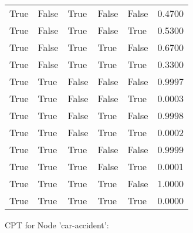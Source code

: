 \begin{tabular}{lllllr}
         True &         False &         True &        False & False & 0.4700 \\
         True &         False &         True &        False &  True & 0.5300 \\
         True &         False &         True &         True & False & 0.6700 \\
         True &         False &         True &         True &  True & 0.3300 \\
         True &          True &        False &        False & False & 0.9997 \\
         True &          True &        False &        False &  True & 0.0003 \\
         True &          True &        False &         True & False & 0.9998 \\
         True &          True &        False &         True &  True & 0.0002 \\
         True &          True &         True &        False & False & 0.9999 \\
         True &          True &         True &        False &  True & 0.0001 \\
         True &          True &         True &         True & False & 1.0000 \\
         True &          True &         True &         True &  True & 0.0000 \\
\bottomrule
\end{tabular}


CPT for Node 'car-accident':


